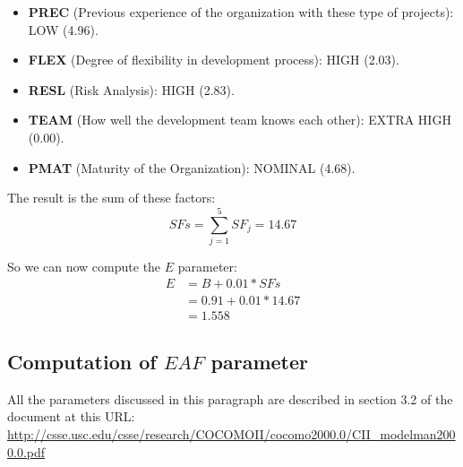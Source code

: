 \documentclass[../../../../projectPlan.tex]{subfiles}
\begin{document}
			\begin{itemize}
				\item \textbf{PREC} (Previous experience of the organization with these type of projects): LOW (4.96).
				\item \textbf{FLEX} (Degree of flexibility in development process): HIGH (2.03).
				\item \textbf{RESL} (Risk Analysis): HIGH (2.83).
				\item \textbf{TEAM} (How well the development team knows each other): EXTRA HIGH (0.00).
				\item \textbf{PMAT} (Maturity of the Organization): NOMINAL (4.68).
			\end{itemize}

			The result is the sum of these factors:
			\[SFs = \sum_{j=1}^{5} SF_j = 14.67 \]

			So we can now compute the \(E\) parameter:
			\begin{align*}
				E & = B + 0.01 * SFs \\
			   	  & = 0.91 + 0.01 * 14.67 \\
			      & = 1.558
			\end{align*}

		\subsection{Computation of \(EAF\) parameter}
			All the parameters discussed in this paragraph are described in section 3.2 of the document at this URL: \url{http://csse.usc.edu/csse/research/COCOMOII/cocomo2000.0/CII_modelman2000.0.pdf}
\end{document}
